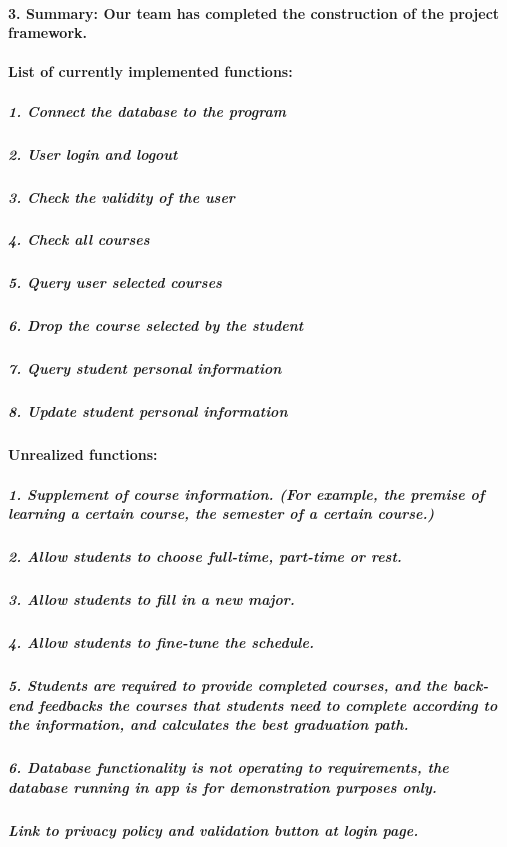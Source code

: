 \documentclass[12pt]{article}
\begin{document}
\paragraph{3. Summary: Our team has completed the construction of the project framework. }

\paragraph{List of currently implemented functions:}
\subparagraph{1. Connect the database to the program}
\subparagraph{2. User login and logout}
\subparagraph{3. Check the validity of the user}
\subparagraph{4. Check all courses}
\subparagraph{5. Query user selected courses}
\subparagraph{6. Drop the course selected by the student}
\subparagraph{7. Query student personal information}
\subparagraph{8. Update student personal information}

\paragraph{Unrealized functions:}
\subparagraph{1. Supplement of course information. (For example, the premise of learning a certain course, the semester of a certain course.)}
\subparagraph{2. Allow students to choose full-time, part-time or rest.}
\subparagraph{3. Allow students to fill in a new major.}
\subparagraph{4. Allow students to fine-tune the schedule.}
\subparagraph{5. Students are required to provide completed courses, and the back-end feedbacks the courses that students need to complete according to the information, and calculates the best graduation path.}
\subparagraph{6. Database functionality is not operating to requirements, the database running in app is for demonstration purposes only.}
\subparagraph{Link to privacy policy and validation button at login page.}

\newpage
\end{document}
